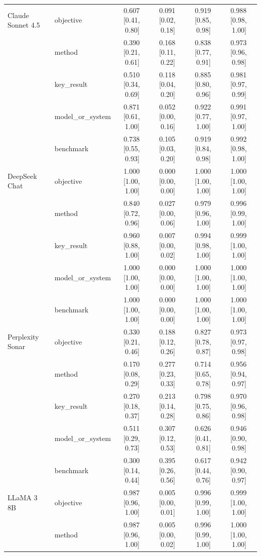 \documentclass[11pt]{article}
\begin{document}
{\begin{longtable}{@{}p{3.2cm}lcccc@{}}
  \midrule
  Claude Sonnet 4.5 & objective & 0.607\,[0.41,\,0.80] & 0.091\,[0.02,\,0.18] & 0.919\,[0.85,\,0.98] & 0.988\,[0.98,\,1.00] \\
   & method & 0.390\,[0.21,\,0.61] & 0.168\,[0.11,\,0.22] & 0.838\,[0.77,\,0.91] & 0.973\,[0.96,\,0.98] \\
   & key\_result & 0.510\,[0.34,\,0.69] & 0.118\,[0.04,\,0.20] & 0.885\,[0.80,\,0.96] & 0.981\,[0.97,\,0.99] \\
   & model\_or\_system & 0.871\,[0.61,\,1.00] & 0.052\,[0.00,\,0.16] & 0.922\,[0.77,\,1.00] & 0.991\,[0.97,\,1.00] \\
   & benchmark & 0.738\,[0.55,\,0.93] & 0.105\,[0.03,\,0.20] & 0.919\,[0.84,\,0.98] & 0.992\,[0.98,\,1.00] \\
  \midrule
  DeepSeek Chat & objective & 1.000\,[1.00,\,1.00] & 0.000\,[0.00,\,0.00] & 1.000\,[1.00,\,1.00] & 1.000\,[1.00,\,1.00] \\
   & method & 0.840\,[0.72,\,0.96] & 0.027\,[0.00,\,0.06] & 0.979\,[0.96,\,1.00] & 0.996\,[0.99,\,1.00] \\
   & key\_result & 0.960\,[0.88,\,1.00] & 0.007\,[0.00,\,0.02] & 0.994\,[0.98,\,1.00] & 0.999\,[1.00,\,1.00] \\
   & model\_or\_system & 1.000\,[1.00,\,1.00] & 0.000\,[0.00,\,0.00] & 1.000\,[1.00,\,1.00] & 1.000\,[1.00,\,1.00] \\
   & benchmark & 1.000\,[1.00,\,1.00] & 0.000\,[0.00,\,0.00] & 1.000\,[1.00,\,1.00] & 1.000\,[1.00,\,1.00] \\
  \midrule
  Perplexity Sonar & objective & 0.330\,[0.21,\,0.46] & 0.188\,[0.12,\,0.26] & 0.827\,[0.78,\,0.87] & 0.973\,[0.97,\,0.98] \\
   & method & 0.170\,[0.08,\,0.29] & 0.277\,[0.23,\,0.33] & 0.714\,[0.65,\,0.78] & 0.956\,[0.94,\,0.97] \\
   & key\_result & 0.270\,[0.18,\,0.37] & 0.213\,[0.14,\,0.28] & 0.798\,[0.75,\,0.86] & 0.970\,[0.96,\,0.98] \\
   & model\_or\_system & 0.511\,[0.29,\,0.73] & 0.307\,[0.12,\,0.53] & 0.626\,[0.41,\,0.81] & 0.946\,[0.90,\,0.98] \\
   & benchmark & 0.300\,[0.14,\,0.44] & 0.395\,[0.26,\,0.56] & 0.617\,[0.44,\,0.76] & 0.942\,[0.90,\,0.97] \\
  \midrule
  LLaMA 3 8B & objective & 0.987\,[0.96,\,1.00] & 0.005\,[0.00,\,0.01] & 0.996\,[0.99,\,1.00] & 0.999\,[1.00,\,1.00] \\
   & method & 0.987\,[0.96,\,1.00] & 0.005\,[0.00,\,0.02] & 0.996\,[0.99,\,1.00] & 1.000\,[1.00,\,1.00] \\

\end{longtable}}
\end{document}
